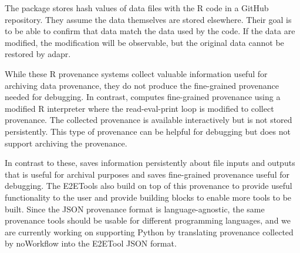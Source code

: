 The  package \citep{Gelfond:RJournal18} stores hash values of data files with the R code in a GitHub repository.  They assume the data themselves are stored elsewhere.  Their goal is to be able to confirm that data match the data used by the code.  If the data are modified, the modification will be observable, but the original data cannot be restored by adapr.

While these R provenance systems collect valuable information useful for archiving data provenance, they do not produce the fine-grained provenance needed for debugging. 
In contrast,  \citep{Silles:IPAW10, Runnalls:IPAW12} computes fine-grained provenance using a modified R interpreter where the read-eval-print loop is modified to collect provenance.  The collected provenance is available interactively but is not stored persistently.  This type of provenance can be helpful for debugging but does not support archiving the provenance.

In contrast to these,  saves information persistently about file inputs and outputs that is useful for archival purposes and saves fine-grained provenance useful for debugging.  The E2ETools also build on top of this provenance to provide useful functionality to the user and provide building blocks to enable more tools to be built.  Since the JSON provenance format is language-agnostic, the same provenance tools should be usable for different programming languages, and we are currently working on supporting Python by translating provenance collected by noWorkflow \citep{Leonardo:IPAW14} into the E2ETool JSON format.


